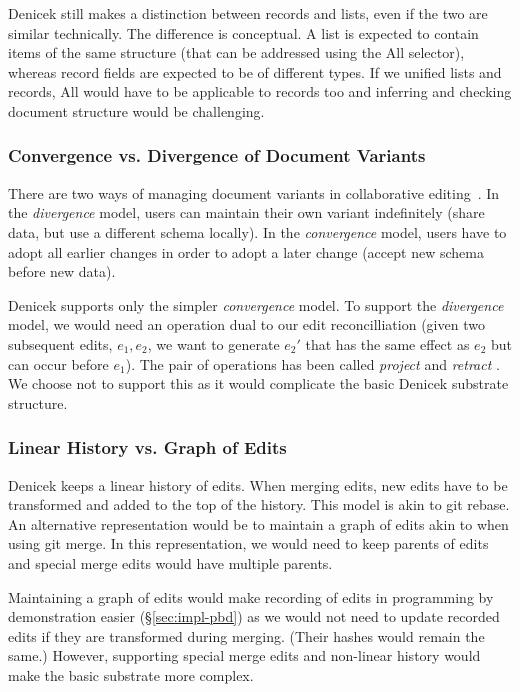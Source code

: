 \documentclass[sigconf,anonymous,screen]{acmart}
\newcommand{\ident}[1]{{\sffamily #1}}
\begin{document}
Denicek still makes a distinction between records and lists, even if the two are similar
technically. The difference is conceptual. A list is expected to contain items of the
same structure (that can be addressed using the \ident{All} selector), whereas record fields
are expected to be of different types. If we unified lists and records, \ident{All} would have
to be applicable to records too and inferring and checking document structure would be
challenging.

\subsubsection*{Convergence vs. Divergence of Document Variants}
There are two ways of managing document variants in collaborative editing~\cite{edwards-2025-schema}.
In the \emph{divergence} model, users can maintain their own variant indefinitely (share data,
but use a different schema locally). In the \emph{convergence} model, users have to adopt all
earlier changes in order to adopt a later change (accept new schema before new data).

Denicek supports only the simpler \emph{convergence} model. To support the \emph{divergence}
model, we would need an operation dual to our edit reconcilliation (given two subsequent edits,
$e_1, e_2$, we want to generate $e_2'$ that has the same effect as $e_2$ but can occur before
$e_1$). The pair of operations has been called \emph{project} and \emph{retract}
\cite{edwards-2021-typed}. We choose not to support this as it would complicate the basic
Denicek substrate structure.

\subsubsection*{Linear History vs. Graph of Edits}
Denicek keeps a linear history of edits. When merging edits, new edits have to be transformed and
added to the top of the history. This model is akin to git rebase. An alternative representation
would be to maintain a graph of edits akin to when using git merge. In this representation,
we would need to keep parents of edits and special merge edits would have multiple parents.

Maintaining a graph of edits would make recording of edits in programming by demonstration
easier (\S\ref{sec:impl-pbd}) as we would not need to update recorded edits if they are
transformed during merging. (Their hashes would remain the same.) However, supporting special
merge edits and non-linear history would make the basic substrate more complex.
\end{document}
